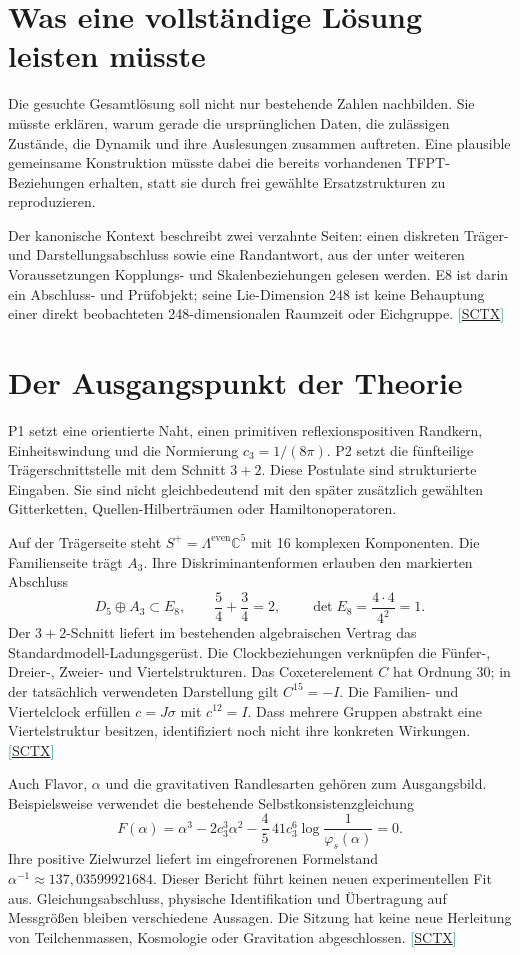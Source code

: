 \documentclass[11pt,a4paper,oneside,parskip=half,headings=normal,numbers=noenddot,bibliography=totoc]{scrreprt}
\newcommand{\C}{\mathbb C}
\newcommand{\src}[1]{\textcolor{teal}{\small[\hyperref[s:#1]{S#1}]}}
\begin{document}
\section{Was eine vollständige Lösung leisten müsste}
Die gesuchte Gesamtlösung soll nicht nur bestehende Zahlen nachbilden. Sie müsste erklären, warum gerade die ursprünglichen Daten, die zulässigen Zustände, die Dynamik und ihre Auslesungen zusammen auftreten. Eine plausible gemeinsame Konstruktion müsste dabei die bereits vorhandenen TFPT-Beziehungen erhalten, statt sie durch frei gewählte Ersatzstrukturen zu reproduzieren.

Der kanonische Kontext beschreibt zwei verzahnte Seiten: einen diskreten Träger- und Darstellungsabschluss sowie eine Randantwort, aus der unter weiteren Voraussetzungen Kopplungs- und Skalenbeziehungen gelesen werden. E8 ist darin ein Abschluss- und Prüfobjekt; seine Lie-Dimension 248 ist keine Behauptung einer direkt beobachteten 248-dimensionalen Raumzeit oder Eichgruppe. \src{CTX}

\section{Der Ausgangspunkt der Theorie}
P1 setzt eine orientierte Naht, einen primitiven reflexionspositiven Randkern, Einheitswindung und die Normierung $c_3=1/(8\pi)$. P2 setzt die fünfteilige Trägerschnittstelle mit dem Schnitt $3+2$. Diese Postulate sind strukturierte Eingaben. Sie sind nicht gleichbedeutend mit den später zusätzlich gewählten Gitterketten, Quellen-Hilberträumen oder Hamiltonoperatoren.

Auf der Trägerseite steht $S^+=\Lambda^{\mathrm{even}}\C^5$ mit 16 komplexen Komponenten. Die Familienseite trägt $A_3$. Ihre Diskriminantenformen erlauben den markierten Abschluss
\[
 D_5\oplus A_3\subset E_8,\qquad
 \frac54+\frac34=2,\qquad
 \det E_8=\frac{4\cdot4}{4^2}=1.
\]
Der $3+2$-Schnitt liefert im bestehenden algebraischen Vertrag das Standardmodell-Ladungsgerüst. Die Clockbeziehungen verknüpfen die Fünfer-, Dreier-, Zweier- und Viertelstrukturen. Das Coxeterelement $C$ hat Ordnung 30; in der tatsächlich verwendeten Darstellung gilt $C^{15}=-I$. Die Familien- und Viertelclock erfüllen $c=J\sigma$ mit $c^{12}=I$. Dass mehrere Gruppen abstrakt eine Viertelstruktur besitzen, identifiziert noch nicht ihre konkreten Wirkungen. \src{CTX}

Auch Flavor, $\alpha$ und die gravitativen Randlesarten gehören zum Ausgangsbild. Beispielsweise verwendet die bestehende Selbstkonsistenzgleichung
\[
 F(\alpha)=\alpha^3-2c_3^3\alpha^2-\frac45\,41c_3^6
 \log\!\frac1{\varphi_s(\alpha)}=0.
\]
Ihre positive Zielwurzel liefert im eingefrorenen Formelstand $\alpha^{-1}\approx137{,}03599921684$. Dieser Bericht führt keinen neuen experimentellen Fit aus. Gleichungsabschluss, physische Identifikation und Übertragung auf Messgrößen bleiben verschiedene Aussagen. Die Sitzung hat keine neue Herleitung von Teilchenmassen, Kosmologie oder Gravitation abgeschlossen. \src{CTX}
\end{document}
